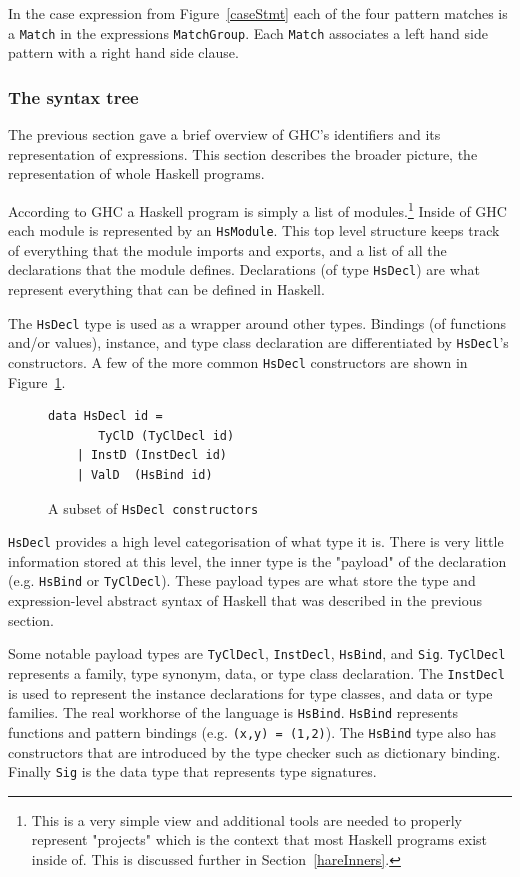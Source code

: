 In the case expression from Figure~\ref{caseStmt} each of the four pattern matches is a \texttt{Match} in the expressions \texttt{MatchGroup}. Each \texttt{Match} associates a left hand side pattern with a right hand side clause. 

\subsubsection{The syntax tree}
The previous section gave a brief overview of GHC's identifiers and its representation of expressions. This section describes the broader picture, the representation of whole Haskell programs.  

According to GHC a Haskell program is simply a list of modules.\footnote{This is a very simple view and additional tools are needed to properly represent "projects" which is the context that most Haskell programs exist inside of. This is discussed further in Section~\ref{hareInners}.} Inside of GHC each module is represented by an \texttt{HsModule}. This top level structure keeps track of everything that the module imports and exports, and a list of all the declarations that the module defines. Declarations (of type \texttt{HsDecl}) are what represent everything that can be defined in Haskell. 

The \texttt{HsDecl} type is used as a wrapper around other types. Bindings (of functions and/or values), instance, and type class declaration are differentiated by \texttt{HsDecl}'s constructors. A few of the more common \texttt{HsDecl} constructors are shown in Figure~\ref{hsdecl}. 

\begin{figure}
\begin{lstlisting}
data HsDecl id =
	   TyClD (TyClDecl id)
	| InstD (InstDecl id)
	| ValD  (HsBind id)
\end{lstlisting}
\caption{A subset of \texttt{HsDecl constructors}}
\label{hsdecl}
\end{figure}

\texttt{HsDecl} provides a high level categorisation of what type it is. There is very little information stored at this level, the inner type is the "payload" of the declaration (e.g. \texttt{HsBind} or \texttt{TyClDecl}). These payload types are what store the type and expression-level abstract syntax of Haskell that was described in the previous section.

Some notable payload types are \texttt{TyClDecl}, \texttt{InstDecl}, \texttt{HsBind}, and \texttt{Sig}. \texttt{TyClDecl} represents a family, type synonym, data, or type class declaration. The \texttt{InstDecl} is used to represent the instance declarations for type classes, and data or type families. The real workhorse of the language is \texttt{HsBind}. \texttt{HsBind} represents functions and pattern bindings (e.g. \texttt{(x,y) = (1,2)}). The \texttt{HsBind} type also has constructors that are introduced by the type checker such as dictionary binding. Finally \texttt{Sig} is the data type that represents type signatures. 

